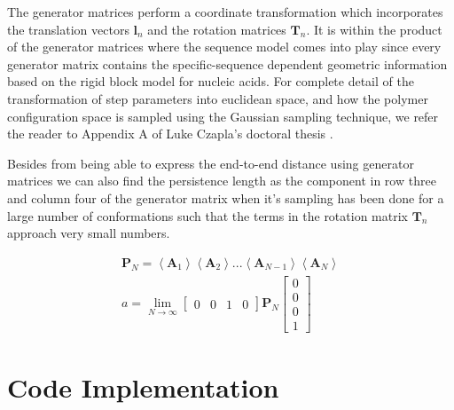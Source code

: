 The  generator  matrices  perform  a coordinate  transformation  which
incorporates the translation vectors $\mathbf{l}_{n}$ and the rotation
matrices $\mathbf{T}_{n}$.  It is within the product  of the generator
matrices  where  the  sequence  model  comes  into  play  since  every
generator  matrix contains  the specific-sequence  dependent geometric
information based  on the  rigid block model  for nucleic  acids.  For
complete  detail  of  the   transformation  of  step  parameters  into
euclidean  space, and how  the polymer  configuration space  is sampled
using the Gaussian sampling technique,  we refer the reader to Appendix
A of Luke Czapla's doctoral thesis \cite{czapla2009}.

Besides from being able to express the end-to-end distance using
generator matrices we can also find the persistence length as the
component in row three and column four of the generator matrix when
it's sampling has been done for a large number of conformations such
that the terms in the rotation matrix $\mathbf{T}_{n}$ approach very
small numbers.

\begin{gather}
\mathbf{P}_{N} = \left<\mathbf{A}_{1}\right> \left<\mathbf{A}_{2}\right> ... \left<
\mathbf{A}_{N-1}\right> \left< \mathbf{A}_{N}\right>\\
a = \lim_{N \to \infty} \left[\begin{array}{cccc}0 & 0 & 1 & 0\end{array}
    \right] \mathbf{P}_{N}
\left[\begin{array}{c} 0\\ 0\\ 0\\ 1\end{array}\right]
\end{gather}  

\section{Code Implementation}














